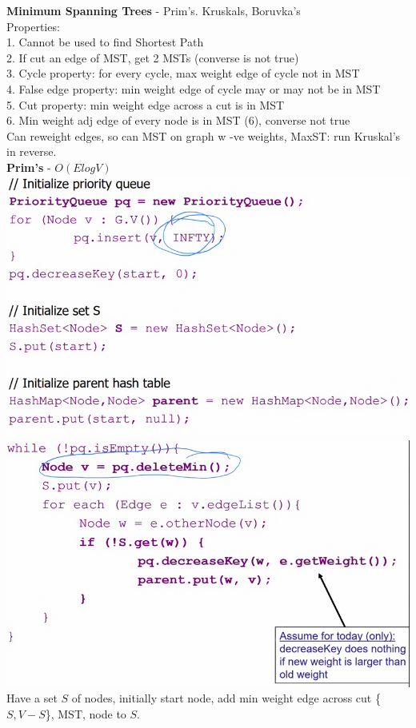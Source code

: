 \documentclass[10pt, a4paper]{article}
\begin{document}
\begin{multicols*}{3}
		{\normalsize\textbf{Minimum Spanning Trees}} - Prim's. Kruskals, Boruvka's\\
		Properties:\\
		1. Cannot be used to find Shortest Path\\
		2. If cut an edge of MST, get 2 MSTs (converse is not true)\\
		3. Cycle property: for every cycle, max weight edge of cycle not in MST\\
		4. False edge property: min weight edge of cycle may or may not be in MST\\
		5. Cut property: min weight edge across a cut is in MST\\
		6. Min weight adj edge of every node is in MST (6), converse not true\\
		Can reweight edges, so can MST on graph w -ve weights, MaxST: run Kruskal's in reverse.\\
		\textbf{Prim's} - $O(ElogV)$\\ 
		\includegraphics[scale=.2]{./assets/Prim}\\
		\includegraphics[scale=.18]{./assets/Prim2} Have a set $S$ of nodes, initially start node, add min weight edge across cut \{$S, V - S$\}, MST, node to $S$.\\

\end{multicols*}
\end{document}
